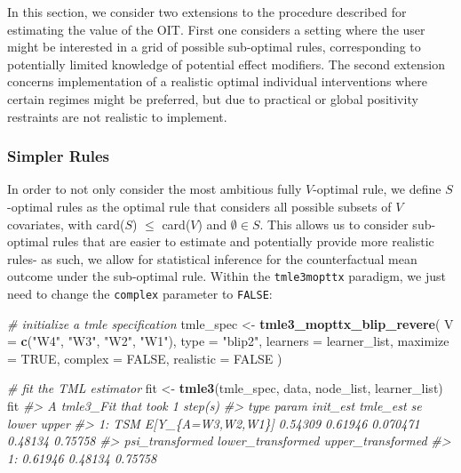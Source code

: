 \documentclass[12pt, krantz2,]{krantz}
\newenvironment{Shaded}{\begin{snugshade}}{\end{snugshade}}
\newcommand{\CommentTok}[1]{\textcolor[rgb]{0.37,0.37,0.37}{\textit{#1}}}
\newcommand{\DataTypeTok}[1]{\textcolor[rgb]{0.27,0.27,0.27}{#1}}
\newcommand{\KeywordTok}[1]{\textcolor[rgb]{0.27,0.27,0.27}{\textbf{#1}}}
\newcommand{\NormalTok}[1]{#1}
\newcommand{\OtherTok}[1]{\textcolor[rgb]{0.37,0.37,0.37}{#1}}
\newcommand{\StringTok}[1]{\textcolor[rgb]{0.5,0.5,0.5}{#1}}
\theoremstyle{definition}
\theoremstyle{definition}
\theoremstyle{definition}
\newcommand{\1}{\mathbbm{1}}
\begin{document}
In this section, we consider two extensions to the procedure described for
estimating the value of the OIT. First one considers a setting where the user
might be interested in a grid of possible sub-optimal rules, corresponding to
potentially limited knowledge of potential effect modifiers. The second
extension concerns implementation of a realistic optimal individual
interventions where certain regimes might be preferred, but due to practical or
global positivity restraints are not realistic to implement.

\hypertarget{simpler-rules}{%
\subsubsection{Simpler Rules}\label{simpler-rules}}

In order to not only consider the most ambitious fully \(V\)-optimal rule, we
define \(S\)-optimal rules as the optimal rule that considers all possible subsets
of \(V\) covariates, with card(\(S\)) \(\leq\) card(\(V\)) and \(\emptyset \in S\). This
allows us to consider sub-optimal rules that are easier to estimate and
potentially provide more realistic rules- as such, we allow for statistical
inference for the counterfactual mean outcome under the sub-optimal rule.
Within the \texttt{tmle3mopttx} paradigm, we just need to change the \texttt{complex}
parameter to \texttt{FALSE}:

\begin{Shaded}
\begin{Highlighting}[]
\CommentTok{# initialize a tmle specification}
\NormalTok{tmle_spec <-}\StringTok{ }\KeywordTok{tmle3_mopttx_blip_revere}\NormalTok{(}
  \DataTypeTok{V =} \KeywordTok{c}\NormalTok{(}\StringTok{"W4"}\NormalTok{, }\StringTok{"W3"}\NormalTok{, }\StringTok{"W2"}\NormalTok{, }\StringTok{"W1"}\NormalTok{), }\DataTypeTok{type =} \StringTok{"blip2"}\NormalTok{,}
  \DataTypeTok{learners =}\NormalTok{ learner_list,}
  \DataTypeTok{maximize =} \OtherTok{TRUE}\NormalTok{, }\DataTypeTok{complex =} \OtherTok{FALSE}\NormalTok{, }\DataTypeTok{realistic =} \OtherTok{FALSE}
\NormalTok{)}
\end{Highlighting}
\end{Shaded}

\begin{Shaded}
\begin{Highlighting}[]
\CommentTok{# fit the TML estimator}
\NormalTok{fit <-}\StringTok{ }\KeywordTok{tmle3}\NormalTok{(tmle_spec, data, node_list, learner_list)}
\NormalTok{fit}
\CommentTok{#> A tmle3_Fit that took 1 step(s)}
\CommentTok{#>    type             param init_est tmle_est       se   lower   upper}
\CommentTok{#> 1:  TSM E[Y_\{A=W3,W2,W1\}]  0.54309  0.61946 0.070471 0.48134 0.75758}
\CommentTok{#>    psi_transformed lower_transformed upper_transformed}
\CommentTok{#> 1:         0.61946           0.48134           0.75758}
\end{Highlighting}
\end{Shaded}
\end{document}
